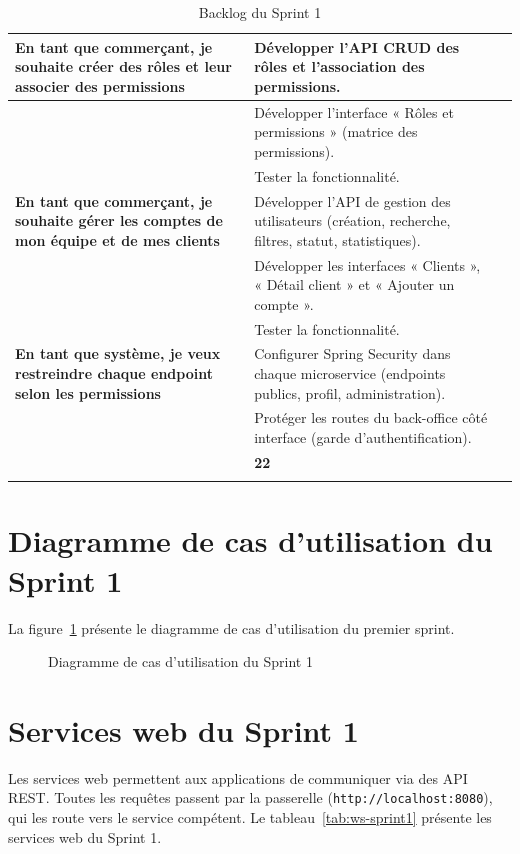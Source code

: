 \begin{longtable}{|>{\raggedright\arraybackslash}p{4cm}|>{\raggedright\arraybackslash}p{9cm}|>{\centering\arraybackslash}p{1.2cm}|}
\textbf{En tant que commerçant, je souhaite créer des rôles et leur associer des permissions}
& Développer l'API CRUD des rôles et l'association des permissions. & 1 \\
\cline{2-3}
& Développer l'interface « Rôles et permissions » (matrice des permissions). & 1 \\
\cline{2-3}
& Tester la fonctionnalité. & 1 \\
\hline

\textbf{En tant que commerçant, je souhaite gérer les comptes de mon équipe et de mes clients}
& Développer l'API de gestion des utilisateurs (création, recherche, filtres, statut, statistiques). & 1 \\
\cline{2-3}
& Développer les interfaces « Clients », « Détail client » et « Ajouter un compte ». & 1 \\
\cline{2-3}
& Tester la fonctionnalité. & 1 \\
\hline

\textbf{En tant que système, je veux restreindre chaque endpoint selon les permissions}
& Configurer Spring Security dans chaque microservice (endpoints publics, profil, administration). & 1 \\
\cline{2-3}
& Protéger les routes du back-office côté interface (garde d'authentification). & 1 \\
\hline

\multicolumn{2}{|r|}{\textbf{Total}} & \textbf{22} \\
\hline
\caption{Backlog du Sprint 1}
\label{tab:backlog-sprint1}
\end{longtable}

\section{Diagramme de cas d'utilisation du Sprint 1}
La figure~\ref{fig:cu-sprint1} présente le diagramme de cas d'utilisation du premier sprint.
\begin{figure}[H]
    \centering
    \caption{Diagramme de cas d'utilisation du Sprint 1}
    \label{fig:cu-sprint1}
\end{figure}

\section{Services web du Sprint 1}
Les services web permettent aux applications de communiquer via des API REST. Toutes les requêtes passent par la passerelle (\texttt{http://localhost:8080}), qui les route vers le service compétent. Le tableau~\ref{tab:ws-sprint1} présente les services web du Sprint 1.


